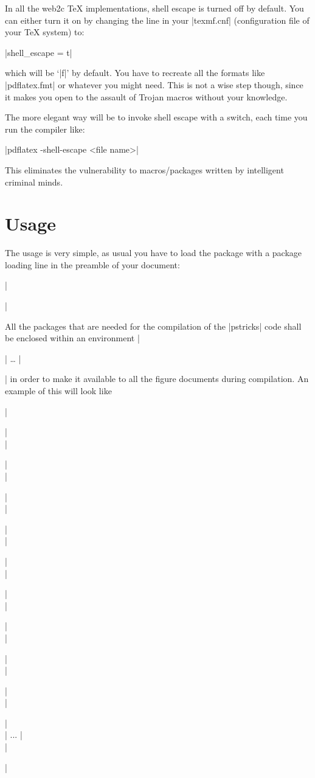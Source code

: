 \documentclass{ltxguide}
\begin{document}
In all the web2c \TeX{} implementations, shell escape is turned off by
default. You can either turn it on by changing the line in your
|texmf.cnf| (configuration file of your \TeX{} system) to:
\begin{decl}
|shell_escape = t|
\end{decl}
which will be `|f|' by default. You have to recreate all the formats
like |pdflatex.fmt| or whatever you might need. This is not a wise
step though, since it makes you open to the assault of Trojan macros
without your knowledge.

The more elegant way will be to invoke shell escape with a switch,
each time you run the compiler like:
\begin{decl}
|pdflatex -shell-escape <file name>|
\end{decl}
This eliminates the vulnerability to macros/packages written by
intelligent criminal minds.

\section{Usage}

The usage is very simple, as usual you have to load the package with a
package loading line in the preamble of your document:

\begin{decl}
|\usepackage{pdftricks}|
\end{decl}

All the packages that are needed for the compilation of the |pstricks|
code shall be enclosed within an environment |\begin{psinputs}| \dots
  |\end{psinputs}| in order to make it available to all the figure
documents during compilation. An example of this will look like
\begin{decl}
|\begin{psinputs}|\\
| \usepackage{pstricks}|\\
| \usepackage{color}   |\\
| \usepackage{pstcol}  |\\
| \usepackage{pst-plot}|\\
| \usepackage{pst-tree}|\\
| \usepackage{pst-eps} |\\
| \usepackage{multido} |\\
| \usepackage{pst-node}|\\
| \usepackage{pst-eps} |\\
| ... |\\
|\end{psinputs}|
\end{decl}
\end{document}
